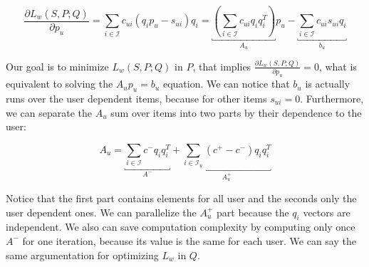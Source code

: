 \[
\frac{\partial L_{w}(S,P;Q)}{\partial p_u} = \sum_{i\in \mathcal{I}} c_{ui}\left(q_ip_u- s_{ui}\right)q_i =
\underbracket{\left(\sum_{i\in\mathcal{I}}c_{ui}q_iq_i^T\right)}_{A_{u}}p_u-
\underbracket{\sum_{i\in\mathcal{I}}c_{ui}s_{ui}q_i}_{b_u}
\]

Our goal is to minimize $L_{w}(S,P;Q)$ in $P$, that implies 
$\frac{\partial L_{w}(S,P;Q)}{\partial p_u}=0$, what is equivalent to solving the $A_{u}p_{u}=b_{u}$ equation. We can notice that $b_u$ is actually runs over the user dependent items, because for other items  $s_{ui}=0$. Furthermore, we can separate the $A_u$ sum over items into two parts by their dependence to the user:

\[A_{u}=\underbracket{\sum_{i\in \mathcal{I}}c^-q_i q_i^T}_{A^-} +
\underbracket{\sum_{i\in\mathcal{I}_{u}}(c^+-c^-)q_i q_i^T}_{A_{u}^{+}} \]

Notice that the first part contains  elements for all user and the seconds only the user
dependent ones. We can parallelize the $A^{+}_{u}$ part because the $q_i$
vectors are independent. We also can save computation complexity by computing only once $A^-$ 
for one iteration, because its value is the same for each user. 
We can say the same argumentation for optimizing $L_{w}$ in $Q$.
